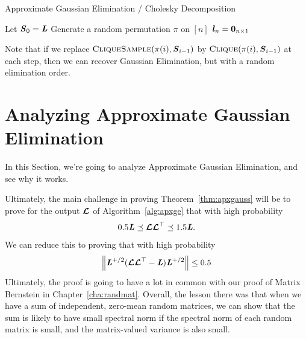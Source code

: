 \begin{algorithm}[H]
\label{alg:apxge}
\caption{Approximate Gaussian Elimination / Cholesky Decomposition}
Let $\boldsymbol{\mathit{S}}_0 = \boldsymbol{\mathit{L}}$\;
Generate a random permutation $\pi$ on $[n]$\;
$\boldsymbol{\mathit{l}}_n = \boldsymbol{0}_{n \times 1}$\;
\Return{$\matlow=\begin{bmatrix} \ll_1 \cdots \ll_n \end{bmatrix}$ and
$\pi$}\;
\end{algorithm}
Note that if we replace
$\textsc{CliqueSample}\!\left({\pi(i),\boldsymbol{\mathit{S}}_{i-1}}\right)$ by $\textsc{Clique}\!\left({\pi(i),\boldsymbol{\mathit{S}}_{i-1}}\right)$ at each
step, then we can recover Gaussian Elimination, but with a random
elimination order.

\section{Analyzing Approximate Gaussian Elimination}

In this Section, we're going to analyze Approximate Gaussian
Elimination, and see why it works.

Ultimately, the main challenge in proving Theorem~\ref{thm:apxgauss}
will be to prove for the output $\boldsymbol{\mathit{{\mathcal{L}}}}$
of Algorithm~\ref{alg:apxge} that with high probability
\begin{equation}
  \label{eq:relerrgoal}
0.5 \boldsymbol{\mathit{L}}
\preceq
\boldsymbol{\mathit{{\mathcal{L}}}} \boldsymbol{\mathit{{\mathcal{L}}}}^{\top}
\preceq 1.5 \boldsymbol{\mathit{L}}
.
\end{equation}
We can reduce this to proving that with high probability
\begin{equation}
\label{eq:spectralnormgoal}
 \left\| \boldsymbol{\mathit{L}}^{+/2} (\boldsymbol{\mathit{{\mathcal{L}}}} \boldsymbol{\mathit{{\mathcal{L}}}}^{\top} -  \boldsymbol{\mathit{L}}) \boldsymbol{\mathit{L}}^{+/2} \right\| \leq 0.5
\end{equation}
Ultimately, the proof is going to have a lot in common with our proof
of Matrix Bernstein in Chapter~\ref{cha:randmat}.
Overall, the lesson there was that when we have a sum of independent,
zero-mean random matrices, we can show that the sum is likely to have
small spectral norm if the spectral norm of each random matrix is
small, and the matrix-valued variance is also small.

